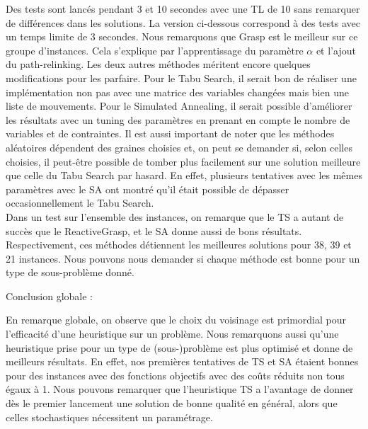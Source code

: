 Des tests sont lancés pendant 3 et 10 secondes avec une TL de 10 sans remarquer de différences dans les solutions. La version ci-dessous correspond à des tests avec un temps limite de 3 secondes. Nous remarquons que Grasp est le meilleur sur ce groupe d'instances. Cela s'explique par l'apprentissage  du paramètre $\alpha$ et l'ajout du path-relinking. Les deux autres méthodes méritent encore quelques modifications pour les parfaire. Pour le Tabu Search, il serait bon de réaliser une implémentation non pas avec une matrice des variables changées mais bien une liste de mouvements. Pour le Simulated Annealing, il serait possible d'améliorer les résultats avec un tuning des paramètres en prenant en compte le nombre de variables et de contraintes. Il est aussi important de noter que les méthodes aléatoires dépendent des graines choisies et, on peut se demander si, selon celles choisies, il peut-être possible de tomber plus facilement sur une solution meilleure que celle du Tabu Search par hasard. En effet, plusieurs tentatives avec les mêmes paramètres avec le SA ont montré qu'il était possible de dépasser occasionnellement le Tabu Search. \\
Dans un test sur l'ensemble des instances, on remarque que le TS a autant de succès que le ReactiveGrasp, et le SA donne aussi de bons résultats. Respectivement, ces méthodes détiennent les meilleures solutions pour 38, 39 et 21 instances. Nous pouvons nous demander si chaque méthode est bonne pour un type de sous-problème donné. 

%
%

\vspace{5mm}
\noindent
{}
\vspace{2mm}


Conclusion globale :

En remarque globale, on observe que le choix du voisinage est primordial pour l'efficacité d'une heuristique sur un problème. Nous remarquons aussi qu'une heuristique prise pour un type de (sous-)problème est plus optimisé et donne de meilleurs résultats. En effet, nos premières tentatives de TS et SA étaient bonnes pour des instances avec des fonctions objectifs avec des coûts réduits non tous égaux à 1. Nous pouvons remarquer que l'heuristique TS a l'avantage de donner dès le premier lancement une solution de bonne qualité en général, alors que celles stochastiques nécessitent un paramétrage.

